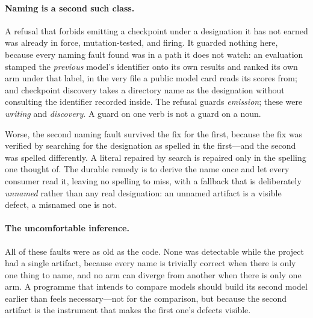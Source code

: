 \paragraph{Naming is a second such class.}
A refusal that forbids emitting a checkpoint under a designation it has not
earned was already in force, mutation-tested, and firing. It guarded nothing
here, because every naming fault found was in a path it does not watch: an
evaluation stamped the \emph{previous} model's identifier onto its own results
and ranked its own arm under that label, in the very file a public model card
reads its scores from; and checkpoint discovery takes a directory name as the
designation without consulting the identifier recorded inside. The refusal
guards \emph{emission}; these were \emph{writing} and \emph{discovery}. A guard
on one verb is not a guard on a noun.

Worse, the second naming fault survived the fix for the first, because the fix
was verified by searching for the designation as spelled in the first---and the
second was spelled differently. A literal repaired by search is repaired only
in the spelling one thought of. The durable remedy is to derive the name once
and let every consumer read it, leaving no spelling to miss, with a fallback
that is deliberately \emph{unnamed} rather than any real designation: an
unnamed artifact is a visible defect, a misnamed one is not.

\paragraph{The uncomfortable inference.}
All of these faults were as old as the code. None was detectable while the
project had a single artifact, because every name is trivially correct when
there is only one thing to name, and no arm can diverge from another when there
is only one arm. A programme that intends to compare models should build its
second model earlier than feels necessary---not for the comparison, but because
the second artifact is the instrument that makes the first one's defects
visible.


